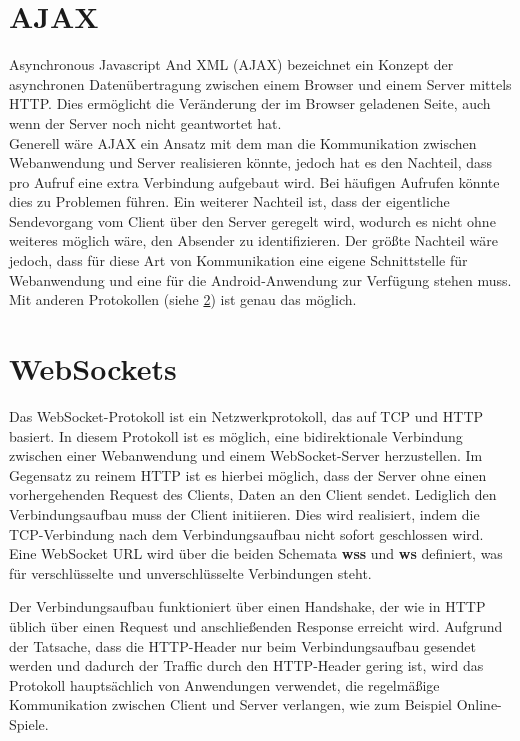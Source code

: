 \section{AJAX}
Asynchronous Javascript And XML (AJAX) bezeichnet ein Konzept der asynchronen Datenübertragung zwischen einem Browser und einem Server mittels HTTP. Dies ermöglicht die Veränderung der im Browser geladenen Seite, auch wenn der Server noch nicht geantwortet hat. \\
Generell wäre AJAX ein Ansatz mit dem man die Kommunikation zwischen Webanwendung und Server realisieren könnte, jedoch hat es den Nachteil, dass pro Aufruf eine extra Verbindung aufgebaut wird. Bei häufigen Aufrufen könnte dies zu Problemen führen. Ein weiterer Nachteil ist, dass der eigentliche Sendevorgang vom Client über den Server geregelt wird, wodurch es nicht ohne weiteres möglich wäre, den Absender zu identifizieren. Der größte Nachteil wäre jedoch, dass für diese Art von Kommunikation eine eigene Schnittstelle für Webanwendung und eine für die Android-Anwendung zur Verfügung stehen muss. Mit anderen Protokollen (siehe \ref{sec:websockets}) ist genau das möglich.


\section{WebSockets}
\label{sec:websockets}
Das WebSocket-Protokoll ist ein Netzwerkprotokoll, das auf TCP und HTTP basiert. In diesem Protokoll ist es möglich, eine bidirektionale Verbindung zwischen einer Webanwendung und einem WebSocket-Server herzustellen. Im Gegensatz zu reinem HTTP ist es hierbei möglich, dass der Server ohne einen vorhergehenden Request des Clients, Daten an den Client sendet. Lediglich den Verbindungsaufbau muss der Client initiieren. Dies wird realisiert, indem die TCP-Verbindung nach dem Verbindungsaufbau nicht sofort geschlossen wird. 
Eine WebSocket URL wird über die beiden Schemata \textbf{wss} und \textbf{ws} definiert, was für verschlüsselte und unverschlüsselte Verbindungen steht.

Der Verbindungsaufbau funktioniert über einen Handshake, der wie in HTTP üblich über einen Request und anschließenden Response erreicht wird. Aufgrund der Tatsache, dass die HTTP-Header nur beim Verbindungsaufbau gesendet werden und dadurch der Traffic durch den HTTP-Header gering ist, wird das Protokoll hauptsächlich von Anwendungen verwendet, die regelmäßige Kommunikation zwischen Client und Server verlangen, wie zum Beispiel Online-Spiele. \\

